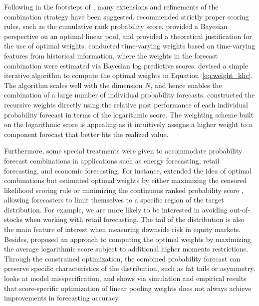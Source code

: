 \documentclass[11pt]{article}
\begin{document}
Following in the footsteps of \citet{Hall2007-lh}, many extensions and refinements of the combination strategy have been suggested. \citet{Gneiting2007-ij} recommended strictly proper scoring rules, such as the cumulative rank probability score. \citet{Geweke2011-xk} provided a Bayesian perspective on an optimal linear pool, and provided a theoretical justification for the use of optimal weights. \citet{Li2021-gk} conducted time-varying weights based on time-varying features from historical information, where the weights in the forecast combination were estimated via Bayesian log predictive scores. \citet{Conflitti2015-fq} devised a simple iterative algorithm to compute the optimal weights in Equation~\eqref{eq:weight_klic}. The algorithm scales well with the dimension $N$, and hence enables the combination of a large number of individual probability forecasts. \citet{Jore2010-yi} constructed the recursive weights directly using the relative past performance of each individual probability forecast in terms of the logarithmic score. The weighting scheme built on the logarithmic score is appealing as it intuitively assigns a higher weight to a component forecast that better fits the realized value.

Furthermore, some special treatments were given to accommodate probability forecast combinations in applications such as energy forecasting, retail forecasting, and economic forecasting. For instance, \citet{Opschoor2017-yu} extended the idea of optimal combinations but estimated optimal weights by either maximizing the censored likelihood scoring rule \citep{Diks2011-gj} or minimizing the continuous ranked probability score \citep{Gneiting2014-tz}, allowing forecasters to limit themselves to a specific region of the target distribution. For example, we are more likely to be interested in avoiding out-of-stocks when working with retail forecasting. The tail of the distribution is also the main feature of interest when measuring downside risk in equity markets. Besides, \citet{Pauwels2020-zl} proposed an approach to computing the optimal weights by maximizing the average logarithmic score subject to additional higher moments restrictions. Through the constrained optimization, the combined probability forecast can preserve specific characteristics of the distribution, such as fat tails or asymmetry. \citet{Martin2021-yi} looks at model misspecification, and shows via simulation and empirical results that score-specific optimization of linear pooling weights does not always achieve improvements in forecasting accuracy.
\end{document}
